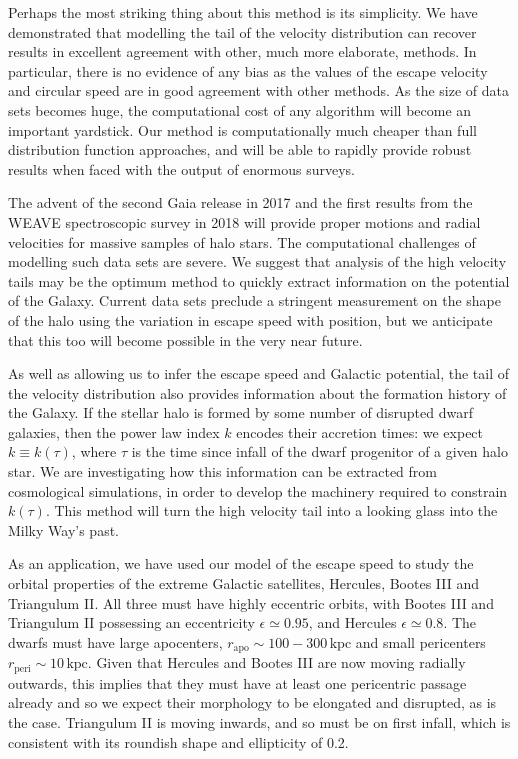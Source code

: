 \documentclass[useAMS,twocolumn,usenatbib]{mn2e}
\def\kpc{{\,\mathrm{kpc}}}
\def\rp{{r_\mathrm{peri}}}
\def\ra{{r_\mathrm{apo}}}
\begin{document}
Perhaps the most striking thing about this method is its simplicity. 
We have demonstrated that modelling the tail of the velocity distribution can recover results in excellent agreement with other, much more elaborate, methods. 
In particular, there is no evidence of any bias as the values of the escape velocity and circular speed are in good agreement with other methods.  
As the size of data sets becomes huge, the computational cost of any algorithm will become an important yardstick. 
Our method is computationally much cheaper than full distribution function approaches, and will be able to rapidly provide robust results when faced with the output of enormous surveys.

The advent of the second Gaia release in 2017 and the first results from the WEAVE spectroscopic survey in 2018 will provide proper motions and radial velocities for massive samples of halo stars. 
The computational challenges of modelling such data sets are severe. 
We suggest that analysis of the high velocity tails may be the optimum method to quickly extract information on the potential of the Galaxy.  
Current data sets preclude a stringent measurement on the shape of the halo using the variation in escape speed with position, but we anticipate that this too will become possible in the very near future.

As well as allowing us to infer the escape speed and Galactic potential, the tail of the velocity distribution also provides information about the formation history of the Galaxy.
If the stellar halo is formed by some number of disrupted dwarf galaxies, then the power law index $k$ encodes their accretion times: we expect $k \equiv k(\tau)$, where $\tau$ is the time since infall of the dwarf progenitor of a given halo star.
We are investigating how this information can be extracted from cosmological simulations, in order to develop the machinery required to constrain $k(\tau)$. 
This method will turn the high velocity tail into a looking glass into the Milky Way's past.

As an application, we have used our model of the escape speed to study the orbital properties of the extreme Galactic satellites, Hercules, Bootes III and Triangulum II. 
All three must have highly eccentric orbits, with Bootes III and Triangulum II possessing an eccentricity $\epsilon \simeq 0.95$, and Hercules
$\epsilon \simeq 0.8$. 
The dwarfs must have large apocenters, $\ra \sim 100 - 300\kpc$ and small pericenters $\rp \sim 10\kpc$. 
Given that Hercules and Bootes III are now moving radially outwards, this implies that they must have at least one pericentric passage already and so we expect their morphology to be elongated and disrupted, as is the case. 
Triangulum II is moving inwards, and so must be on first infall, which is consistent with its roundish shape and ellipticity of 0.2.
\end{document}
